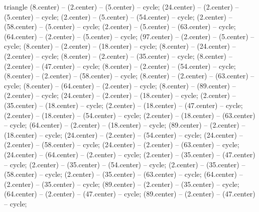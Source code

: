 \begin{pgfonlayer}{triangle}
 (8.center) -- (2.center) -- (5.center) -- cycle; 
 (24.center) -- (2.center) -- (5.center) -- cycle; 
 (2.center) -- (5.center) -- (54.center) -- cycle; 
 (2.center) -- (58.center) -- (5.center) -- cycle; 
 (2.center) -- (5.center) -- (63.center) -- cycle; 
 (64.center) -- (2.center) -- (5.center) -- cycle; 
 (97.center) -- (2.center) -- (5.center) -- cycle; 
 (8.center) -- (2.center) -- (18.center) -- cycle; 
 (8.center) -- (24.center) -- (2.center) -- cycle; 
 (8.center) -- (2.center) -- (35.center) -- cycle; 
 (8.center) -- (2.center) -- (47.center) -- cycle; 
 (8.center) -- (2.center) -- (54.center) -- cycle; 
 (8.center) -- (2.center) -- (58.center) -- cycle; 
 (8.center) -- (2.center) -- (63.center) -- cycle; 
 (8.center) -- (64.center) -- (2.center) -- cycle; 
 (8.center) -- (89.center) -- (2.center) -- cycle; 
 (24.center) -- (2.center) -- (18.center) -- cycle; 
 (2.center) -- (35.center) -- (18.center) -- cycle; 
 (2.center) -- (18.center) -- (47.center) -- cycle; 
 (2.center) -- (18.center) -- (54.center) -- cycle; 
 (2.center) -- (18.center) -- (63.center) -- cycle; 
 (64.center) -- (2.center) -- (18.center) -- cycle; 
 (89.center) -- (2.center) -- (18.center) -- cycle; 
 (24.center) -- (2.center) -- (54.center) -- cycle; 
 (24.center) -- (2.center) -- (58.center) -- cycle; 
 (24.center) -- (2.center) -- (63.center) -- cycle; 
 (24.center) -- (64.center) -- (2.center) -- cycle; 
 (2.center) -- (35.center) -- (47.center) -- cycle; 
 (2.center) -- (35.center) -- (54.center) -- cycle; 
 (2.center) -- (35.center) -- (58.center) -- cycle; 
 (2.center) -- (35.center) -- (63.center) -- cycle; 
 (64.center) -- (2.center) -- (35.center) -- cycle; 
 (89.center) -- (2.center) -- (35.center) -- cycle; 
 (64.center) -- (2.center) -- (47.center) -- cycle; 
 (89.center) -- (2.center) -- (47.center) -- cycle; 

\end{pgfonlayer}
